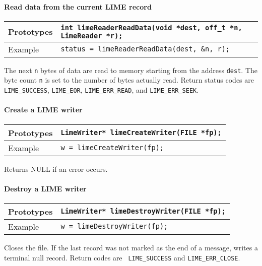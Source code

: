 \documentclass{article}
\begin{document}
\paragraph{Read data from the current LIME record}
%
\begin{flushleft}
  \begin{tabular}{|l|l|}
  \hline
  Prototypes     & \verb|int limeReaderReadData(void *dest, off_t *n, LimeReader *r);| \\
\hline
  Example  & \verb|status = limeReaderReadData(dest, &n, r);| \\
   \hline
 \end{tabular}
\end{flushleft}
%
The next {\tt n} bytes of data are read to memory starting from the
address {\tt dest}.  The byte count {\tt n} is set to the number
of bytes actually read.  Return status codes are {\tt LIME\_SUCCESS},
{\tt LIME\_EOR}, {\tt LIME\_ERR\_READ}, and {\tt LIME\_ERR\_SEEK}.

\paragraph{Create a LIME writer}
%
\begin{flushleft}
  \begin{tabular}{|l|l|}
  \hline
  Prototypes     & \verb|LimeWriter* limeCreateWriter(FILE *fp);| \\
\hline
  Example  & \verb|w = limeCreateWriter(fp);| \\
   \hline
 \end{tabular}
\end{flushleft}
%
Returns NULL if an error occurs.

\paragraph{Destroy a LIME writer}
%
\begin{flushleft}
  \begin{tabular}{|l|l|}
  \hline
  Prototypes     & \verb|LimeWriter* limeDestroyWriter(FILE *fp);| \\
\hline
  Example  & \verb|w = limeDestroyWriter(fp);| \\
   \hline
 \end{tabular}
\end{flushleft}
%
Closes the file.  If the last record was not marked as the end of a
message, writes a terminal null record.  Return codes are {\tt
LIME\_SUCCESS} and {\tt LIME\_ERR\_CLOSE}.
\end{document}

